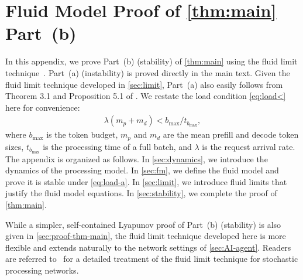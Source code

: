 \documentclass[11pt]{article}
\theoremstyle{plain}
\theoremstyle{definition}
\theoremstyle{remark}
\begin{document}


\section{Fluid Model Proof of \cref{thm:main} Part~(b)}
\label{sec:basic}
In this appendix, we prove Part~(b) (stability) of \cref{thm:main} using the fluid limit technique~\citep{dai1995positive,dai2020processing}. 
Part~(a) (instability) is proved directly in the main text. Given the fluid limit technique developed in \cref{sec:limit}, Part~(a) also easily follows from Theorem 3.1 and Proposition 5.1 of \citet{Dai1996}.
We restate the load condition \cref{eq:load<} here for convenience:
\begin{align}\label{eq:load-a}
  \lambda(m_p+m_d)< b_{\max}/t_{b_{\max}},
\end{align}
where $b_{\max}$ is the token budget, $m_p$ and $m_d$ are the mean prefill and decode
token sizes, $t_{b_{\max}}$ is the processing time of a full
batch, and $\lambda$ is the request arrival rate. The appendix is organized as follows. In \cref{sec:dynamics}, we introduce the dynamics of the processing model.
In \cref{sec:fm}, we define the fluid model and prove it is stable under \cref{eq:load-a}. In \cref{sec:limit}, we introduce fluid limits that justify the fluid model equations. In \cref{sec:stability}, we complete the proof of \cref{thm:main}.

While a simpler, self-contained Lyapunov proof of Part~(b) (stability) is also given in \cref{sec:proof-thm-main}, the fluid limit technique developed here is more flexible and extends naturally to the network settings of \cref{sec:AI-agent}. Readers are referred to~\citep{dai2020processing} for a detailed treatment of the fluid limit technique for stochastic processing networks.
\end{document}
